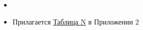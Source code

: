 \begin{itemize}
    \item {}
    \item Прилагается \hyperlink{tableN}{Таблица N} в Приложении 2
\end{itemize}
